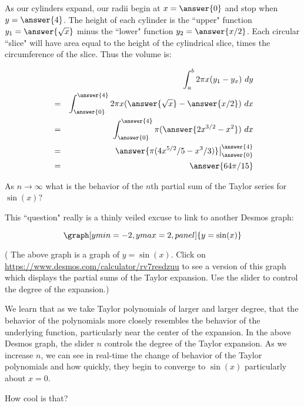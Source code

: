 \documentclass{ximera}
\begin{document}
\begin{question}
\begin{enumerate}
\begin{explanation}
As our cylinders expand, our radii begin at $x=\answer{0}$ and stop when $y=\answer{4}$.  The height of each cylinder is the ``upper" function $y_1=\answer{\sqrt{x}}$ minus the ``lower" function $y_2=\answer{x/2}$.  Each circular ``slice" will have area equal to the height of the cylindrical slice, times the circumference of the slice.  Thus the volume is:

\begin{eqnarray*}
&&\int_a^b 2\pi x(y_1-y_x)\ dy\\
&=&\int_{\answer{0}}^{\answer{4}}2\pi x(\answer{\sqrt{x}}-\answer{x/2})\ dx\\
&=&\int_{\answer{0}}^{\answer{4}}\pi (\answer{2x^{3/2}-x^2})\ dx\\
&=&\answer{\pi(4x^{5/2}/5-x^3/3)}\big|_{\answer{0}}^{\answer{4}}\\
&=&\answer{64\pi/15}
\end{eqnarray*}


\end{explanation}




\end{enumerate}

\end{question}



\begin{question}
As $n\to \infty$ what is the behavior of the $n$th partial sum of the Taylor series for $\sin(x)$?

\begin{explanation}
This ``question" really is a thinly veiled excuse to link to another Desmos graph:

\begin{onlineOnly}
$$\graph[ymin=-2,ymax=2, panel]{y=\sin(x)}$$
\end{onlineOnly}
( The above graph is a graph of $y=\sin(x)$.  Click on \url{https://www.desmos.com/calculator/rv7resdzuu} to see a  version of this graph which displays the partial sums of the Taylor expansion.  Use the slider to control the degree of the expansion.)


We learn that as we take Taylor polynomials of larger and larger degree, that the behavior of the polynomials more closely resembles the behavior of the underlying function, particularly near the center of the expansion.  In the above Desmos graph, the slider $n$ controls the degree of the Taylor expansion.  As we increase $n$, we can see in real-time the change of behavior of the Taylor polynomials and how quickly, they begin to converge to $\sin(x)$ particularly about $x=0$.

How cool is that?


\begin{multipleChoice}
\end{multipleChoice}




\end{explanation}
\end{question}
\end{document}
